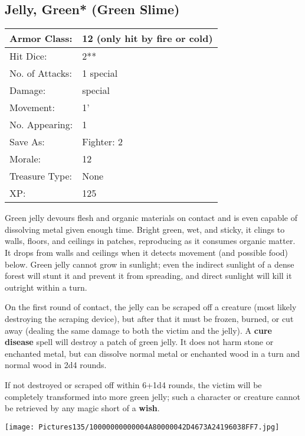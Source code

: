 \documentclass[a4paper,twoside,openany,10pt]{book}
\begin{document}
\begin{multicols}{2}
\subsection*{Jelly, Green* (Green Slime)}\label{jelly-green-green-slime}

\begin{tabularx}{0.50\textwidth}{@{}lX@{}}
Armor Class: & 12 (only hit by fire or cold) \\\hline
Hit Dice: & 2** \\\hline
No. of Attacks: & 1 special \\\hline
Damage: & special \\\hline
Movement: & 1' \\\hline
No. Appearing: & 1 \\\hline
Save As: & Fighter: 2 \\\hline
Morale: & 12 \\\hline
Treasure Type: & None \\\hline
XP: & 125 \\\hline
\end{tabularx}\medskip

Green jelly devours flesh and organic materials on contact and is even capable of dissolving metal given enough time. Bright green, wet, and sticky, it clings to walls, floors, and ceilings in patches, reproducing as it consumes organic matter. It drops from walls and ceilings when it detects movement (and possible food) below. Green jelly cannot grow in sunlight; even the indirect sunlight of a dense forest will stunt it and prevent it from spreading, and direct sunlight will kill it outright within a turn.

On the first round of contact, the jelly can be scraped off a creature (most likely destroying the scraping device), but after that it must be frozen, burned, or cut away (dealing the same damage to both the victim and the jelly). A \textbf{cure disease} spell will destroy a patch of green jelly. It does not harm stone or enchanted metal, but can dissolve normal metal or enchanted wood in a turn and normal wood in 2d4 rounds.

If not destroyed or scraped off within 6+1d4 rounds, the victim will be completely transformed into more green jelly; such a character or creature cannot be retrieved by any magic short of a \textbf{wish}.

\begin{center} \texttt{[image: Pictures135/10000000000004A80000042D4673A24196038FF7.jpg]} \end{center}



\end{multicols}
\end{document}
